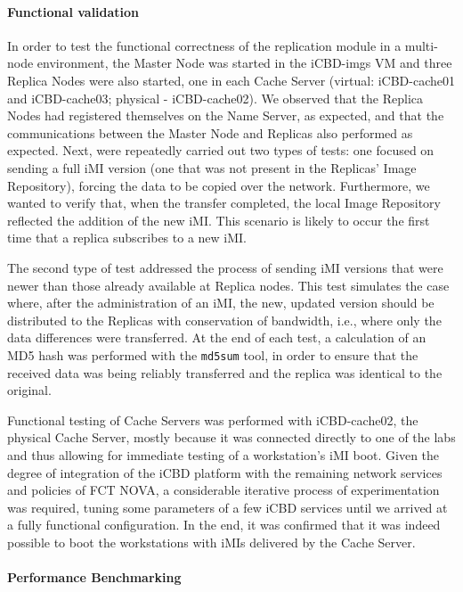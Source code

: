 \paragraph{Functional validation}
\label{par:eval_func_val}

In order to test the functional correctness of the replication module in a multi-node environment, the Master Node was started in the iCBD-imgs VM and three Replica Nodes were also started, one in each Cache Server (virtual: iCBD-cache01 and iCBD-cache03; physical - iCBD-cache02). We observed that the Replica Nodes had registered themselves on the Name Server, as expected, and that the communications between the Master Node and Replicas also performed as expected.
Next, were repeatedly carried out two types of tests: one focused on sending a full iMI version (one that was not present in the Replicas’ Image Repository), forcing the data to be copied over the network.
Furthermore, we wanted to verify that, when the transfer completed, the local Image Repository reflected the addition of the new iMI. This scenario is likely to occur the first time that a replica subscribes to a new iMI.

The second type of test addressed the process of sending iMI versions that were newer than those already available at Replica nodes. This test simulates the case where, after the administration of an iMI, the new, updated version should be distributed to the Replicas with conservation of bandwidth, i.e., where only the data differences were transferred. At the end of each test, a calculation of an MD5 hash was performed with the \texttt{md5sum} tool, in order to ensure that the received data was being reliably transferred and the replica was identical to the original.

Functional testing of Cache Servers was performed with iCBD-cache02, the physical Cache Server, mostly because it was connected directly to one of the labs and thus allowing for immediate testing of a workstation’s iMI boot. Given the degree of integration of the iCBD platform with the remaining network services and policies of FCT NOVA, a considerable iterative process of experimentation was required, tuning some parameters of a few iCBD services until we arrived at a fully functional configuration. In the end, it was confirmed that it was indeed possible to boot the workstations with iMIs delivered by the Cache Server.

\paragraph{Performance Benchmarking}
\label{par:eval_perf_bench}

